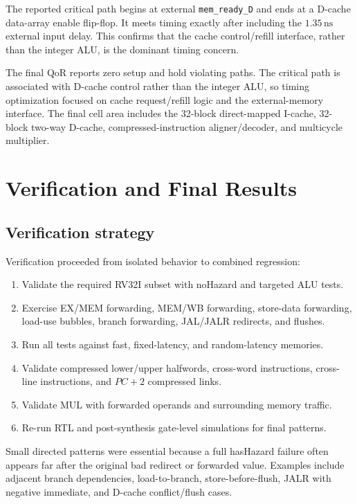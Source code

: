 \documentclass[11pt,a4paper]{article}
\newcommand{\SI}[2]{\ensuremath{#1\,\mathrm{#2}}}
\begin{document}
The reported critical path begins at external \texttt{mem\_ready\_D} and ends
at a D-cache data-array enable flip-flop.  It meets timing exactly after
including the \SI{1.35}{ns} external input delay.  This confirms that the cache
control/refill interface, rather than the integer ALU, is the dominant timing
concern.

The final QoR reports zero setup and hold violating paths.  The critical path
is associated with D-cache control rather than the integer ALU, so timing
optimization focused on cache request/refill logic and the external-memory
interface.  The final cell area includes the 32-block direct-mapped I-cache,
32-block two-way D-cache, compressed-instruction aligner/decoder, and
multicycle multiplier.

\section{Verification and Final Results}

\subsection{Verification strategy}
Verification proceeded from isolated behavior to combined regression:
\begin{enumerate}
  \item Validate the required RV32I subset with noHazard and targeted ALU tests.
  \item Exercise EX/MEM forwarding, MEM/WB forwarding, store-data forwarding,
        load-use bubbles, branch forwarding, JAL/JALR redirects, and flushes.
  \item Run all tests against fast, fixed-latency, and random-latency memories.
  \item Validate compressed lower/upper halfwords, cross-word instructions,
        cross-line instructions, and \(PC+2\) compressed links.
  \item Validate MUL with forwarded operands and surrounding memory traffic.
  \item Re-run RTL and post-synthesis gate-level simulations for final patterns.
\end{enumerate}

Small directed patterns were essential because a full hasHazard failure often
appears far after the original bad redirect or forwarded value.  Examples
include adjacent branch dependencies, load-to-branch, store-before-flush,
JALR with negative immediate, and D-cache conflict/flush cases.
\end{document}
